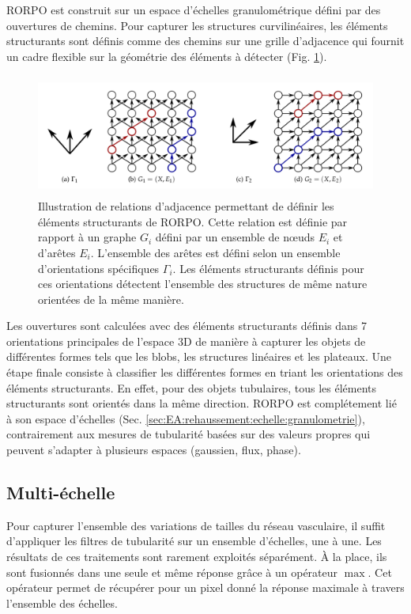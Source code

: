 \label{sec:sub_rorpo}
RORPO \cite{Merveille2018_curvilinear} est construit sur un espace d'échelles granulométrique défini par des ouvertures de chemins. Pour capturer les structures curvilinéaires, les éléments structurants sont définis comme des chemins sur une grille d'adjacence qui fournit un cadre flexible sur la géométrie des éléments à détecter (Fig. \ref{fig:rorpo_adjacency}). 
\begin{figure}[ht]
\centering
\includegraphics[height=4cm]{Images/rorpo_path.png}
\caption{Illustration de relations d'adjacence permettant de définir les éléments structurants de RORPO. Cette relation est définie par rapport à un graphe $G_i$ défini par un ensemble de nœuds $E_i$ et d'arêtes $E_i$. L'ensemble des arêtes est défini selon un ensemble d'orientations spécifiques $\Gamma_i$. Les éléments structurants définis pour ces orientations détectent l'ensemble des structures de même nature orientées de la même manière.}
\label{fig:rorpo_adjacency}
\end{figure}
Les ouvertures sont calculées avec des éléments structurants définis dans 7 orientations principales de l'espace 3D de manière à capturer les objets de différentes formes tels que les blobs, les structures linéaires et les plateaux. Une étape finale consiste à classifier les différentes formes en triant les orientations des éléments structurants. En effet, pour des objets tubulaires, tous les éléments structurants sont orientés dans la même direction. RORPO est complétement lié à son espace d'échelles (Sec. \ref{sec:EA:rehaussement:echelle:granulometrie}), contrairement aux mesures de tubularité basées sur des valeurs propres qui peuvent s'adapter à plusieurs espaces (gaussien, flux, phase).
\subsection{Multi-échelle}
  \label{sec:EA:rehaussement:echelle:multiScale}
   Pour capturer l'ensemble des variations de tailles du réseau vasculaire, il suffit d'appliquer les filtres de tubularité sur un ensemble d'échelles, une à une. Les résultats de ces traitements sont rarement exploités séparément. À la place, ils sont fusionnés dans une seule et même réponse grâce à un opérateur $\max$. Cet opérateur permet de récupérer pour un pixel donné la réponse maximale à travers l'ensemble des échelles.

